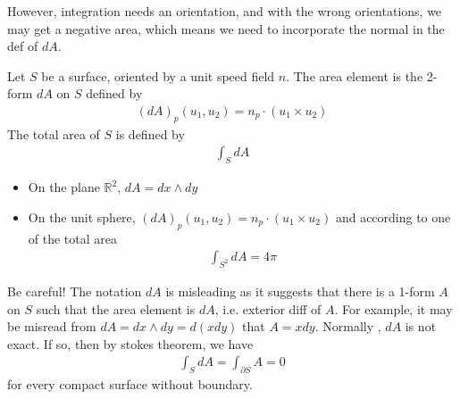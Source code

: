 \documentclass[10pt]{article}
\begin{document}
            However, integration needs an orientation, and with the wrong orientations, we may get a negative area, which means we need to incorporate the normal in the def of $dA$.
            \begin{definition}
                Let $S$ be a surface, oriented by a unit speed field $n$. The area element is the 2-form $dA$ on $S$ defined by
                \begin{equation*}
                    \begin{aligned}
                        (dA)_p(u_1, u_2) = n_p\cdot (u_1\times u_2)
                    \end{aligned}
                \end{equation*}
                The total area of $S$ is defined by
                \begin{equation*}
                    \begin{aligned}
                        \int_SdA
                    \end{aligned}
                \end{equation*}
            \end{definition}
            \begin{example}
                \begin{itemize}
                    \item On the plane $\mathbb{R}^2$, $dA = dx\wedge dy$
                    \item On the unit sphere, $(dA)_p(u_1,u_2) = n_p\cdot(u_1\times u_2)$ and according to one of the total area
                    \begin{equation*}
                        \begin{aligned}
                            \int_{S^2}dA = 4\pi
                        \end{aligned}
                    \end{equation*}
                \end{itemize}
            \end{example}
            \begin{remark}
                Be careful! The notation $dA$ is misleading as it suggests that there is a 1-form $A$ on $S$ such that the area element is $dA$, i.e. exterior diff of $A$. For example, it may be misread from $dA = dx\wedge dy = d(xdy)$ that $A = xdy$. Normally , $dA$ is not exact. If so, then by stokes theorem, we have
                \begin{equation*}
                    \begin{aligned}
                        \int_SdA = \int_{\partial S}A = 0
                    \end{aligned}
                \end{equation*}
                for every compact surface without boundary.
            \end{remark}
\end{document}
